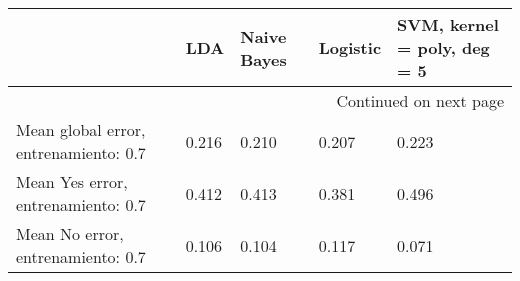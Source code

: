 \begin{longtable}{p{4cm}|p{1.5cm}|p{1.5cm}|p{1.5cm}|p{1.5cm}}
\toprule
{} &   LDA &  Naive Bayes &  Logistic &  SVM, kernel = poly, deg = 5 \\
\midrule
\endhead
\midrule
\multicolumn{5}{r}{{Continued on next page}} \\
\midrule
\endfoot

\bottomrule
\endlastfoot
Mean global error, entrenamiento: 0.7 & 0.216 &        0.210 &     0.207 &                        0.223 \\
Mean Yes error, entrenamiento: 0.7    & 0.412 &        0.413 &     0.381 &                        0.496 \\
Mean No error, entrenamiento: 0.7     & 0.106 &        0.104 &     0.117 &                        0.071 \\
\end{longtable}
